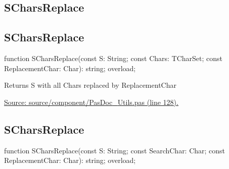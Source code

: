 \documentclass{report}
\newif\ifpdf
\begin{document}
\subsection*{\large{\textbf{SCharsReplace}}\normalsize\hspace{1ex}\hrulefill}
\else
\subsection*{SCharsReplace}
\fi
\label{PasDoc_Utils-SCharsReplace}
\begin{list}{}{
\setlength{\itemindent}{0cm}
\setlength{\listparindent}{0cm}
\setlength{\leftmargin}{\evensidemargin}
\addtolength{\leftmargin}{\tmplength}
\settowidth{\labelsep}{X}
\addtolength{\leftmargin}{\labelsep}
\setlength{\labelwidth}{\tmplength}
}
\item[\textbf{Declaration}\hfill]
\ifpdf
\begin{flushleft}
\fi
\begin{ttfamily}
function SCharsReplace(const S: String; const Chars: TCharSet; const ReplacementChar: Char): string; overload;\end{ttfamily}

\ifpdf
\end{flushleft}
\fi

\par
\item[\textbf{Description}]
Returns S with all Chars replaced by ReplacementChar\par
\href{https://github.com/pasdoc/pasdoc/blob/master/source/component/PasDoc_Utils.pas#L128}{Source: source/component/PasDoc{\_}Utils.pas (line 128).}

\end{list}
\ifpdf
\subsection*{\large{\textbf{SCharsReplace}}\normalsize\hspace{1ex}\hrulefill}
\else
\subsection*{SCharsReplace}
\fi
\label{PasDoc_Utils-SCharsReplace}
\begin{list}{}{
\setlength{\itemindent}{0cm}
\setlength{\listparindent}{0cm}
\setlength{\leftmargin}{\evensidemargin}
\addtolength{\leftmargin}{\tmplength}
\settowidth{\labelsep}{X}
\addtolength{\leftmargin}{\labelsep}
\setlength{\labelwidth}{\tmplength}
}
\item[\textbf{Declaration}\hfill]
\ifpdf
\begin{flushleft}
\fi
\begin{ttfamily}
function SCharsReplace(const S: String; const SearchChar: Char; const ReplacementChar: Char): string; overload;\end{ttfamily}

\ifpdf
\end{flushleft}
\fi

\end{list}
\ifpdf
\end{document}
